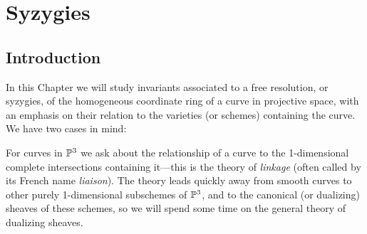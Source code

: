 

\chapter{Syzygies}
\label{SyzygiesChapter}


%
%
%
%
%
%
%
%
\def\length{{\rm length}}
\section{Introduction} 
%
%


In this Chapter we will study  invariants associated to a free resolution, or syzygies, of the homogeneous coordinate ring of a curve in projective space, with an emphasis on their relation to the varieties (or schemes) containing the curve. We have two cases in mind:

For curves in $\PP^{3}$ we ask about the relationship of a curve to the 1-dimensional complete intersections containing it---this is the theory of \emph{linkage} (often called by its French name \emph{liaison}). The theory leads quickly away from smooth curves to other purely 1-dimensional subschemes of $\PP^{3}$, and to the canonical (or dualizing) sheaves of these schemes, so we will spend some time on the general theory of dualizing sheaves.

